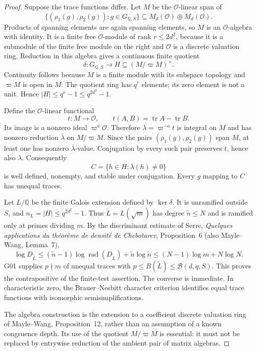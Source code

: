 \begin{proof}
Suppose the trace functions differ.  Let $M$ be the $\mathcal O$-linear span of
\[
 \{(\rho_1(g),\rho_2(g)):g\in G_{\mathbb Q,S}\}
 \subseteq M_d(\mathcal O)\oplus M_d(\mathcal O).
\]
Products of spanning elements are again spanning elements, so $M$ is an $\mathcal O$-algebra with identity. It is a finite free $\mathcal O$-module of rank $r\le2d^2$, because it is a submodule of the finite free module on the right and $\mathcal O$ is a discrete valuation ring.  Reduction in this algebra gives a continuous finite quotient
\[
 \delta:G_{\mathbb Q,S}\longrightarrow H\subseteq(M/\varpi M)^\times.
\]
Continuity follows because $M$ is a finite module with its subspace topology and $\varpi M$ is open in $M$.  The quotient ring has $q^r$ elements; its zero element is not a unit. Hence $|H|\le q^r-1\le q^{2d^2}-1$.

Define the $\mathcal O$-linear functional
\[
 t:M\longrightarrow\mathcal O,\qquad t(A,B)=\operatorname{tr}A-\operatorname{tr}B.
\]
Its image is a nonzero ideal $\varpi^a\mathcal O$. Therefore $\lambda=\varpi^{-a}t$ is integral on $M$ and has nonzero reduction $\overline\lambda$ on $M/\varpi M$. Since the pairs $(\rho_1(g),\rho_2(g))$ span $M$, at least one has nonzero $\overline\lambda$-value. Conjugation by every such pair preserves $t$, hence also $\lambda$. Consequently
\[
 C=\{h\in H:\overline\lambda(h)\ne0\}
\]
is well defined, nonempty, and stable under conjugation. Every $g$ mapping to $C$ has unequal traces.

Let $L/\mathbb Q$ be the finite Galois extension defined by $\ker\delta$. It is unramified outside $S$, and $n_L=|H|\le q^{2d^2}-1$. Thus $\widetilde L=L(\sqrt m)$ has degree $\widetilde n\le N$ and is ramified only at primes dividing $m$. By the discriminant estimate of Serre, \emph{Quelques applications du th\'eor\`eme de densit\'e de Chebotarev}, Proposition~6 (also Mayle--Wang, Lemma~7),
\[
 \log D_{\widetilde L}
 \le(\widetilde n-1)\log\operatorname{rad}(D_{\widetilde L})
       +\widetilde n\log\widetilde n
 \le(N-1)\log m+N\log N.
\]
G01 supplies $p\nmid m$ of unequal traces with $p\le B(\widetilde L)\le\mathcal B(d,q,S)$. This proves the contrapositive of the finite-test assertion. The converse is immediate.  In characteristic zero, the Brauer--Nesbitt character criterion identifies equal trace functions with isomorphic semisimplifications.

The algebra construction is the extension to a coefficient discrete valuation ring of Mayle--Wang, Proposition~12, rather than an assumption of a known congruence depth. Its use of the quotient $M/\varpi M$ is essential: it must not be replaced by entrywise reduction of the ambient pair of matrix algebras.
\end{proof}

